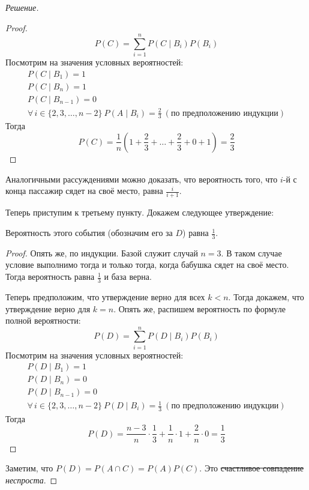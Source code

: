 \documentclass[a4paper,12pt]{article}
\begin{document}
\begin{proof}[Решение]
\begin{proof}
			\[P(C) = \sum\limits_{i = 1}^{n} P(C \mid B_{i})P(B_{i})\]
			Посмотрим на значения условных вероятностей:
			\[\begin{array}{l}
			P(C \mid B_{1}) = 1 \\
			P(C \mid B_{n}) = 1 \\
			P(C \mid B_{n - 1}) = 0 \\
			\forall\,i \in \{2, 3, \ldots, n - 2\}\ P(A \mid B_{i}) = \frac{2}{3}\ (\text{по предположению индукции})
			\end{array}\]
			Тогда
			\[P(C) = \frac{1}{n}\left(1 + \frac{2}{3} + \ldots + \frac{2}{3} + 0 + 1\right) = \frac{2}{3}\]
		\end{proof}
		
		Аналогичными рассуждениями можно доказать, что вероятность того, что \(i\)-й с конца пассажир сядет на своё место, равна \(\frac{i}{i + 1}\).
		
		Теперь приступим к третьему пункту. Докажем следующее утверждение:
		\begin{hypothesis}
			Вероятность этого события (обозначим его за \(D\)) равна \(\frac{1}{3}\).
		\end{hypothesis}
		\begin{proof}
			Опять же, по индукции. Базой служит случай \(n = 3\). В таком случае условие выполнимо тогда и только тогда, когда бабушка сядет на своё место. Тогда вероятность равна \(\frac{1}{3}\) и база верна.
			
			Теперь предположим, что утверждение верно для всех \(k < n\). Тогда докажем, что утверждение верно для \(k = n\). Опять же, распишем вероятность по формуле полной вероятности:
			\[P(D) = \sum\limits_{i = 1}^{n} P(D \mid B_{i}) P(B_{i})\]
			Посмотрим на значения условных вероятностей:
			\[\begin{array}{l}
			P(D \mid B_{1}) = 1 \\
			P(D \mid B_{n}) = 0 \\
			P(D \mid B_{n-1}) = 0 \\
			\forall\,i \in \{2, 3, \ldots, n - 2\}\ P(D \mid B_{i}) = \frac{1}{3}\ (\text{по предположению индукции})
			\end{array}\]
			Тогда
			\[P(D) = \frac{n-3}{n}\cdot \frac{1}{3} + \frac{1}{n}\cdot 1 + \frac{2}{n}\cdot 0 = \frac{1}{3}\]
		\end{proof}
		
		Заметим, что \(P(D) = P(A \cap C) = P(A)P(C)\). Это \sout{счастливое совпадение} \emph{неспроста}.
	\end{proof}
	
\end{document}
